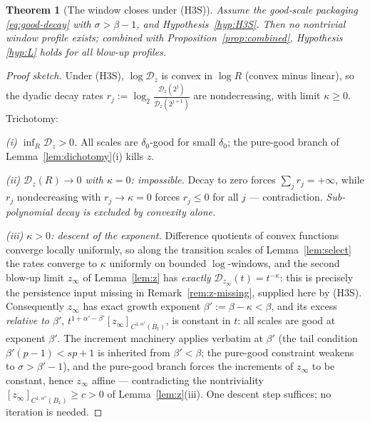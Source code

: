 \documentclass[11pt]{amsart}
\theoremstyle{plain}
\newtheorem{theorem}{Theorem}[section]
\theoremstyle{definition}
\theoremstyle{remark}
\newcommand{\al}{\alpha}
\begin{document}
\begin{theorem}[The window closes under \textnormal{(H3S)}]\label{thm:H3S}
Assume the good-scale packaging \eqref{eq:good-decay} with
$\sigma>\beta-1$, and Hypothesis~\ref{hyp:H3S}. Then no nontrivial window
profile exists; combined with Proposition~\ref{prop:combined}, Hypothesis
\ref{hyp:L} holds for all blow-up profiles.
\end{theorem}
\begin{proof}[Proof sketch]
Under \textnormal{(H3S)}, $\log\mathcal D_z$ is convex in $\log R$
\textnormal{(}convex minus linear\textnormal{)}, so the dyadic decay rates
$r_j:=\log_2\frac{\mathcal D_z(2^j)}{\mathcal D_z(2^{j+1})}$ are
nondecreasing, with limit $\kappa\ge0$. Trichotomy:

\emph{(i) $\inf_R\mathcal D_z>0$.} All scales are $\delta_0$-good for
small $\delta_0$; the pure-good branch of Lemma~\ref{lem:dichotomy}(i)
kills $z$.

\emph{(ii) $\mathcal D_z(R)\to0$ with $\kappa=0$: impossible.} Decay to
zero forces $\sum_jr_j=+\infty$, while $r_j$ nondecreasing with
$r_j\to\kappa=0$ forces $r_j\le0$ for all $j$ --- contradiction.
\emph{Sub-polynomial decay is excluded by convexity alone.}

\emph{(iii) $\kappa>0$: descent of the exponent.} Difference quotients of
convex functions converge locally uniformly, so along the transition
scales of Lemma~\ref{lem:select} the rates converge to $\kappa$ uniformly
on bounded $\log$-windows, and the second blow-up limit $z_\infty$ of
Lemma~\ref{lem:z} has \emph{exactly}
$\mathcal D_{z_\infty}(t)=t^{-\kappa}$: this is precisely the persistence
input missing in Remark~\ref{rem:z-missing}, supplied here by
\textnormal{(H3S)}. Consequently $z_\infty$ has exact growth exponent
$\beta':=\beta-\kappa<\beta$, and its excess \emph{relative to $\beta'$},
$t^{1+\al'-\beta'}[z_\infty]_{C^{1,\al'}(B_t)}$, is constant in $t$: all
scales are good at exponent $\beta'$. The increment machinery applies
verbatim at $\beta'$ \textnormal{(}the tail condition
$\beta'(p-1)<sp+1$ is inherited from $\beta'<\beta$; the pure-good
constraint weakens to $\sigma>\beta'-1$\textnormal{)}, and the pure-good
branch forces the increments of $z_\infty$ to be constant, hence
$z_\infty$ affine --- contradicting the nontriviality
$[z_\infty]_{C^{1,\al''}(B_1)}\ge c>0$ of Lemma~\ref{lem:z}(iii). One
descent step suffices; no iteration is needed.
\end{proof}
\end{document}
